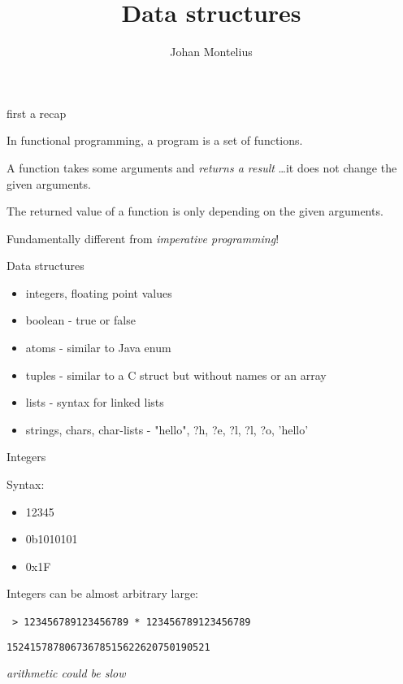 

\title[ID1019 Data structures]{Data structures}


\author{Johan Montelius}
\date{\semester}



\begin{frame}
\titlepage
\end{frame}

\begin{frame}{first a recap}

\pause In functional programming, a program is a set of functions.

\vspace{20pt}\pause A function takes some arguments and {\em returns a result} \ldots it does not change the given arguments.

\vspace{20pt}\pause The returned value of a function is only depending on the given arguments.

\vspace{20pt}\pause Fundamentally different from {\em imperative programming}!


\end{frame}


\begin{frame}{Data structures}

  \begin{itemize}
  \item integers, floating point values \pause
  \item boolean - true or false
  \item atoms - similar to Java enum \pause
  \item tuples - similar to a C struct but without names or an array\pause
  \item lists - syntax for linked lists
  \item strings, chars, char-lists - "hello", ?h, ?e, ?l, ?l, ?o, 'hello'
  \end{itemize}

\end{frame}

\begin{frame}{Integers}

  Syntax:
  \space{10pt}
  \begin{itemize}
  \item 12345 \pause
  \item 0b1010101 \pause
  \item 0x1F \pause
  \end{itemize}  
  
  Integers can be almost arbitrary large: \pause

  \vspace{10pt}\
  {\tt > 123456789123456789 * 123456789123456789}\pause

  {\tt 15241578780673678515622620750190521} \pause
  
  \vspace{20pt}\pause
  {\em arithmetic could be slow}
\end{frame}

